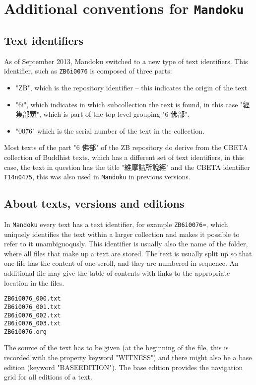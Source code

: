 \documentclass[11pt]{article}
\begin{document}
\section{Additional conventions for \texttt{Mandoku}}
\label{sec-2}


\subsection{Text identifiers}
\label{sec-2-1}
As of September 2013, Mandoku switched to a new type of text
identifiers. This identifier, such as \texttt{ZB6i0076} is composed of three parts:
\begin{itemize}
\item "ZB", which is the repository identifier -- this indicates the origin of the text
\item "6i", which indicates in which subcollection the text is found,
in this case "經集部類", which is part of the top-level grouping
"6 佛部".
\item "0076" which is the serial number of the text in the collection.
\end{itemize}

Most texts of the part "6 佛部" of the ZB repository do derive from
the CBETA collection of Buddhist texts, which has a different set
of text identifiers, in this case, the text in question has the
title "維摩詰所說經" and the CBETA identifier \texttt{T14n0475}, this was
also used in \texttt{Mandoku} in previous versions.
\subsection{About texts, versions and editions}
\label{sec-2-2}

In \texttt{Mandoku} every text has a text identifier, for example
\texttt{ZB6i0076=}, which uniquely identifies the text within a larger
collection and makes it possible to refer to it unambiguoqusly.
This identifier is usually also the name of the folder, where all
files that make up a text are stored. The text is usually split up
so that one file has the content of one scroll, and they are
numbered in sequence.  An additional file may give the table of
contents with links to the appropriate location in the files.

\begin{verbatim}
ZB6i0076_000.txt
ZB6i0076_001.txt
ZB6i0076_002.txt
ZB6i0076_003.txt
ZB6i0076.org
\end{verbatim}


The source of the text has to be given (at the beginning of the
file, this is recorded with the property keyword "WITNESS") and
there might also be a base edition (keyword "BASEEDITION"). The
base edition provides the navigation grid for all editions of a
text.
\end{document}
